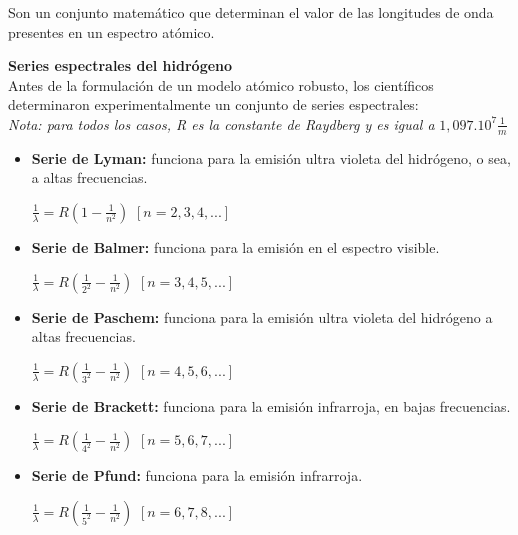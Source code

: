 \documentclass[a4paper]{article}
\begin{document}
        \indent Son un conjunto matemático que determinan el valor de las longitudes de onda presentes en un espectro atómico.

        \textbf{Series espectrales del hidrógeno} \\
            Antes de la formulación de un modelo atómico robusto, los científicos determinaron experimentalmente un conjunto de series espectrales: \\

            \textit{Nota: para todos los casos, R es la constante de Raydberg y es igual a} $1,097 . 10^7 \frac{1}{m}$ \\

            \saltoPag

            \begin{itemize}
                \item \textbf{Serie de Lyman:} funciona para la emisión ultra violeta del hidrógeno, o sea, a altas frecuencias. 
                    \begin{center}
                        $\frac {1}{\lambda} = R(1 - {\frac{1}{n^2}})$ \hspace{2mm} $[n = 2,3,4,...]$
                    \end{center}

                \item \textbf{Serie de Balmer:} funciona para la emisión en el espectro visible.
                    \begin{center}
                        $\frac {1}{\lambda} = R({\frac{1}{2^2}} - {\frac{1}{n^2}})$ \hspace{2mm} $[n = 3,4,5,...]$
                    \end{center}

                \item \textbf{Serie de Paschem:} funciona para la emisión ultra violeta del hidrógeno a altas frecuencias.
                    \begin{center}
                        $\frac {1}{\lambda} = R({\frac{1}{3^2}} - {\frac{1}{n^2}})$ \hspace{2mm} $[n = 4,5,6,...]$
                    \end{center}

                \item \textbf{Serie de Brackett:} funciona para la emisión infrarroja, en bajas frecuencias.
                    \begin{center}
                        $\frac {1}{\lambda} = R({\frac{1}{4^2}} - {\frac{1}{n^2}})$ \hspace{2mm} $[n = 5,6,7,...]$
                    \end{center}

                \item \textbf{Serie de Pfund:} funciona para la emisión infrarroja.
                    \begin{center}
                        $\frac {1}{\lambda} = R({\frac{1}{5^2}} - {\frac{1}{n^2}})$ \hspace{2mm} $[n = 6,7,8,...]$
                    \end{center}
            \end{itemize}
\end{document}
